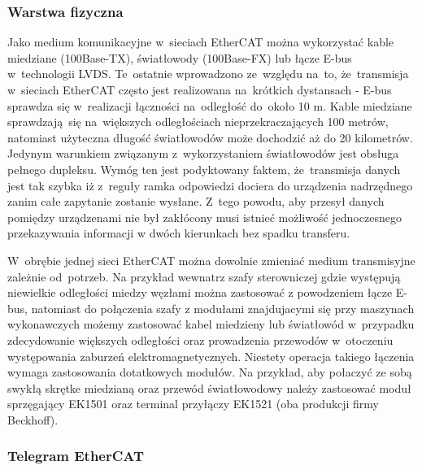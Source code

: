 \subsubsection{Warstwa fizyczna}
Jako medium komunikacyjne w~sieciach EtherCAT można wykorzystać kable miedziane (100Base-TX), światłowody (100Base-FX) lub łącze E-bus w~technologii LVDS. Te~ostatnie wprowadzono ze~względu na~to, że~transmisja w~sieciach EtherCAT często jest realizowana na~krótkich dystansach - E-bus sprawdza się w~realizacji łączności na~odległość do~około 10 m. Kable miedziane sprawdzają~się na~większych odległościach nieprzekraczających 100 metrów, natomiast użyteczna długość światłowodów może dochodzić aż do 20 kilometrów. Jedynym warunkiem związanym z~wykorzystaniem światłowodów jest obsługa pełnego dupleksu. Wymóg ten jest podyktowany faktem, że~transmisja danych jest tak szybka iż z~reguły ramka odpowiedzi dociera do urządzenia nadrzędnego zanim całe zapytanie zostanie wysłane. Z~tego powodu, aby przesył danych pomiędzy urządzenami nie był zakłócony musi istnieć możliwość jednoczesnego przekazywania informacji w dwóch kierunkach bez spadku transferu.

W~obrębie jednej sieci EtherCAT można dowolnie zmieniać medium transmisyjne zależnie od~potrzeb. Na przykład wewnatrz szafy sterowniczej gdzie występują niewielkie odległości miedzy węzłami można zastosować z powodzeniem łącze E-bus, natomiast do połączenia szafy z modułami znajdujacymi się przy maszynach wykonawczych możemy zastosować kabel miedzieny lub światłowód w~przypadku zdecydowanie większych odległości oraz prowadzenia przewodów w~otoczeniu występowania zaburzeń elektromagnetycznych. Niestety operacja takiego łączenia wymaga zastosowania dotatkowych modułów. Na przykład, aby połaczyć ze sobą swykłą skrętke miedzianą oraz przewód światłowodowy należy zastosować moduł sprzęgający EK1501 oraz terminal przyłączy EK1521 (oba produkcji firmy Beckhoff).

\subsubsection{Telegram EtherCAT}

